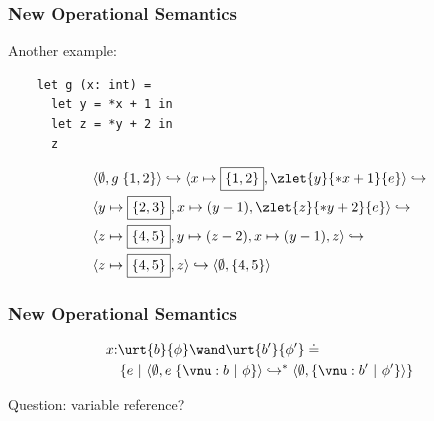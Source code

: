 \begin{frame}[fragile]
    \frametitle{New Operational Semantics}

Another example:
\begin{verbatim}
    let g (x: int) = 
      let y = *x + 1 in
      let z = *y + 2 in
      z
\end{verbatim}
       
\begin{align*}
    &\store{\emptyset, g\;\{1,2\}} \hookrightarrow \store{x\mapsto\boxed{\{1,2\}}, \zlet{y}{*x + 1}{e}} \hookrightarrow
    \\&\store{y\mapsto\boxed{\{2,3\}}, x\mapsto(y - 1), \zlet{z}{*y + 2}{e}} \hookrightarrow
    \\&\store{z\mapsto\boxed{\{4,5\}},y\mapsto(z-2), x\mapsto(y - 1), z} \hookrightarrow 
    \\&\store{z\mapsto\boxed{\{4,5\}}, z} \hookrightarrow \store{\emptyset, \{4,5\}}
\end{align*}

\end{frame}

\begin{frame}[fragile]
    \frametitle{New Operational Semantics}

       
\begin{align*}
    &x{:}\urt{b}{\phi} \wand \urt{b'}{\phi'} \doteq 
    \\&\quad \{ e ~|~ \store{\emptyset, e\;\{\vnu:b ~|~ \phi \}} \hookrightarrow^* \store{\emptyset, \{\vnu:b' ~|~ \phi' \}} \}
\end{align*}

Question: variable reference?

\end{frame}